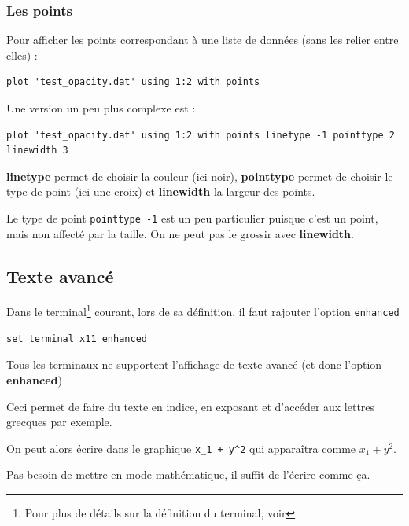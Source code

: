 \documentclass[a4paper,twoside]{article}
\begin{document}
\subsubsection{Les points}
Pour afficher les points correspondant à une liste de données (sans les relier entre elles) :
\begin{verbatim}
plot 'test_opacity.dat' using 1:2 with points
\end{verbatim}

Une version un peu plus complexe est :
\begin{verbatim}
plot 'test_opacity.dat' using 1:2 with points linetype -1 pointtype 2 linewidth 3
\end{verbatim}
\textbf{linetype} permet de choisir la couleur (ici noir), \textbf{pointtype} permet de choisir le type de point (ici une croix) et \textbf{linewidth} la largeur des points. 

\begin{attention}
Le type de point \texttt{pointtype -1} est un peu particulier puisque c'est un point, mais non affecté par la taille. On ne peut pas le grossir avec \textbf{linewidth}.
\end{attention}


\subsection{Texte avancé}\label{sec:enhanced}
Dans le terminal\footnote{Pour plus de détails sur la définition du terminal, voir } courant, lors de sa définition, il faut rajouter l'option \texttt{enhanced}

\begin{verbatim}
set terminal x11 enhanced
\end{verbatim}

\begin{attention}
Tous les terminaux ne supportent l'affichage de texte avancé (et donc l'option \textbf{enhanced})
\end{attention}


Ceci permet de faire du texte en indice, en exposant et d'accéder aux lettres grecques par exemple. 

On peut alors écrire dans le graphique \verb|x_1 + y^2| qui apparaîtra comme $x_1 + y^2$.

\begin{remarque}
Pas besoin de mettre en mode mathématique, il suffit de l'écrire comme ça.
\end{remarque}
\end{document}
